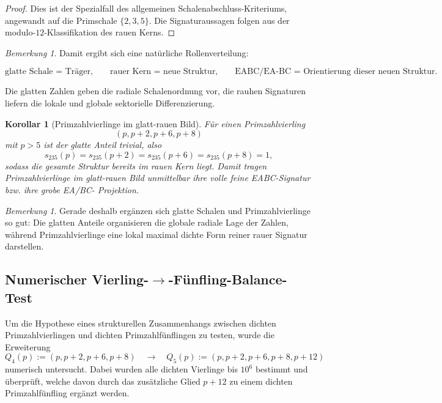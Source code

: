 \documentclass[11pt,a4paper]{article}
\newtheorem{korollar}[satz]{Korollar}
\theoremstyle{definition}
\theoremstyle{remark}
\newtheorem{bemerkung}[satz]{Bemerkung}
\begin{document}
	\begin{proof}
		Dies ist der Spezialfall des allgemeinen Schalenabschluss-Kriteriums, angewandt auf die
		Primschale \(\{2,3,5\}\). Die Signaturaussagen folgen aus der modulo-\(12\)-Klassifikation
		des rauen Kerns.
	\end{proof}
	
	\begin{bemerkung}
		Damit ergibt sich eine natürliche Rollenverteilung:
		
		\[
		\boxed{
			\text{glatte Schale = Träger,}
			\qquad
			\text{rauer Kern = neue Struktur,}
			\qquad
			\text{EABC/EA-BC = Orientierung dieser neuen Struktur.}
		}
		\]
		
		Die glatten Zahlen geben die radiale Schalenordnung vor, die rauhen Signaturen liefern
		die lokale und globale sektorielle Differenzierung.
	\end{bemerkung}
	
	\begin{korollar}[Primzahlvierlinge im glatt-rauen Bild]
		\label{kor:vierling_glatt_rau}
		Für einen Primzahlvierling
		\[
		(p,p+2,p+6,p+8)
		\]
		mit \(p>5\) ist der glatte Anteil trivial, also
		\[
		s_{235}(p)=s_{235}(p+2)=s_{235}(p+6)=s_{235}(p+8)=1,
		\]
		sodass die gesamte Struktur bereits im rauen Kern liegt. Damit tragen Primzahlvierlinge
		im glatt-rauen Bild unmittelbar ihre volle feine EABC-Signatur bzw. ihre grobe EA/BC-
		Projektion.
	\end{korollar}
	
	\begin{bemerkung}
		Gerade deshalb ergänzen sich glatte Schalen und Primzahlvierlinge so gut: Die glatten
		Anteile organisieren die globale radiale Lage der Zahlen, während Primzahlvierlinge eine
		lokal maximal dichte Form reiner rauer Signatur darstellen.
	\end{bemerkung}
	
	\subsection{Numerischer Vierling-\(\to\)-Fünfling-Balance-Test}
	
	Um die Hypothese eines strukturellen Zusammenhangs zwischen dichten Primzahlvierlingen und
	dichten Primzahlfünflingen zu testen, wurde die Erweiterung
	\[
	Q_4(p):=(p,p+2,p+6,p+8)
	\quad\longrightarrow\quad
	Q_5(p):=(p,p+2,p+6,p+8,p+12)
	\]
	numerisch untersucht. Dabei wurden alle dichten Vierlinge bis \(10^6\) bestimmt und
	überprüft, welche davon durch das zusätzliche Glied \(p+12\) zu einem dichten
	Primzahlfünfling ergänzt werden.
	
\end{document}
